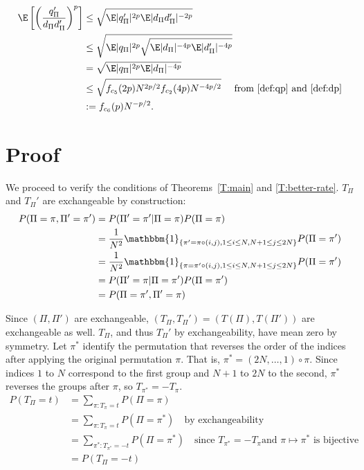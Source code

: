 \begin{align}
  \E \left [ \left ( \frac{q_{\Pi}'}{d_{\Pi}d_{\Pi}'} \right )^p \right ]
  &\leq \sqrt{\E |q_{\Pi}'|^{2p} \E |d_{\Pi}d_{\Pi}'|^{-2p}} \nonumber \\
  &\leq \sqrt{\E |q_{\Pi}|^{2p} \sqrt{\E |d_{\Pi}|^{-4p} \E |d_{\Pi}'|^{-4p}}} \nonumber \\
  &= \sqrt{\E |q_{\Pi}|^{2p} \E |d_{\Pi}|^{-4p}} \nonumber \\
  &\leq \sqrt{f_{c_5}(2p) N^{2p/2} f_{c_2}(4p) N^{-4p/2}} \quad \text{ from
  } \eqref{def:qp} \text{ and } \eqref{def:dp} \nonumber \\
  &:= f_{c_6}(p) N^{-p/2} \label{def:qpddp}.
\end{align}

\section{Proof}
We proceed to verify the conditions of Theorems~\ref{T:main} and \ref{T:better-rate}.
$T_{\Pi}$ and $T_{\Pi}'$ are exchangeable by construction:
\begin{align*}
  P(\Pi = \pi, \Pi' = \pi') &= P(\Pi' = \pi' | \Pi = \pi)P(\Pi = \pi) \\
  &= \frac{1}{N^2}\mathbbm{1}_{\{\pi'=\pi \circ (i,j), 1\leq i \leq N, N+1 \leq j \leq 2N\}} P(\Pi =
  \pi') \\
  &=\frac{1}{N^2}\mathbbm{1}_{\{\pi=\pi' \circ (i,j), 1\leq i \leq N, N+1 \leq j \leq 2N\}} P(\Pi =
  \pi') \\
  &= P(\Pi' = \pi | \Pi = \pi')P(\Pi = \pi') \\
  &= P(\Pi = \pi', \Pi' = \pi)
\end{align*}

Since $(\Pi, \Pi')$ are exchangeable, $(T_{\Pi}, T_{\Pi}') = (T(\Pi), T(\Pi'))$ are exchangeable as
well.  $T_{\Pi}$, and thus $T_{\Pi}'$ by exchangeability, have mean zero by symmetry.  Let $\pi^*$ identify
the permutation that reverses the order of the indices after applying the original permutation
$\pi$.  That is, $\pi^* = (2N, \ldots, 1) \circ \pi$.  Since indices $1$ to $N$ correspond to the
first group and $N+1$ to $2N$ to the second, $\pi^*$ reverses the groups after $\pi$, so $T_{\pi^*} =
-T_{\pi}$.
\begin{align*}
  P(T_{\Pi} = t) &= \sum_{\pi : T_{\pi} = t} P(\Pi = \pi) \\
  &= \sum_{\pi : T_{\pi} = t} P(\Pi = \pi^*) \quad \text{by exchangeability} \\
  &= \sum_{\pi^* : T_{\pi^*} = -t} P(\Pi = \pi^*) \quad \text{since } T_{\pi^*} = -T_{\pi} \text{
    and } \pi \mapsto \pi^* \text{ is bijective} \\
  &= P(T_{\Pi} = -t)
\end{align*}

